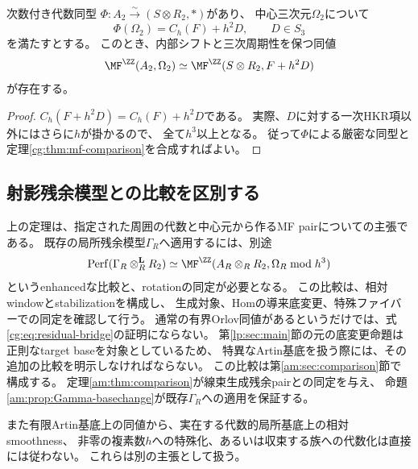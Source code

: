 \begin{corollary}[指定された中心元との照合]
\label{cg:cor:matching}
次数付き代数同型
$\Phi:A_2\xrightarrow{\sim}(S\otimes R_2,*)$があり、
中心三次元$\Omega_2$について
\[
 \Phi(\Omega_2)=C_h(F)+h^2D,\qquad D\in S_3
\]
を満たすとする。
このとき、内部シフトと三次周期性を保つ同値
\[
 \MF^{\ZZ}(A_2,\Omega_2)
 \simeq \MF^{\ZZ}(S\otimes R_2,F+h^2D)
\]
が存在する。
\end{corollary}
\begin{proof}
$C_h(F+h^2D)=C_h(F)+h^2D$である。
実際、$D$に対する一次HKR項以外にはさらに$h$が掛かるので、
全て$h^3$以上となる。
従って$\Phi$による厳密な同型と
定理\ref{cg:thm:mf-comparison}を合成すればよい。
\end{proof}

\subsection{射影残余模型との比較を区別する}

\begin{remark}[MF比較の適用範囲]
\label{cg:rem:scope}
上の定理は、指定された周囲の代数と中心元から作るMF pairについての主張である。
既存の局所残余模型$\Gamma_R$へ適用するには、別途
\begin{equation}\label{cg:eq:residual-bridge}
 \operatorname{Perf}(\Gamma_R\otimes_R^{\mathbf L}R_2)
 \simeq
 \MF^{\ZZ}(A_R\otimes_R R_2,\Omega_R\bmod h^3)
\end{equation}
というenhancedな比較と、rotationの同定が必要となる。
この比較は、相対windowとstabilizationを構成し、
生成対象、Homの導来底変更、特殊ファイバーでの同定を確認して行う。
通常の有界Orlov同値があるというだけでは、式\eqref{cg:eq:residual-bridge}の証明にならない。
第\ref{lp:sec:main}節の元の底変更命題は正則なtarget baseを対象としているため、
特異なArtin基底を扱う際には、その追加の比較を明示しなければならない。
この比較は第\ref{am:sec:comparison}節で構成する。
定理\ref{am:thm:comparison}が線束生成残余pairとの同定を与え、
命題\ref{am:prop:Gamma-basechange}が既存$\Gamma_R$への適用を保証する。

また有限Artin基底上の同値から、実在する代数的局所基底上の相対smoothness、
非零の複素数$h$への特殊化、あるいは収束する族への代数化は直接には従わない。
これらは別の主張として扱う。
\end{remark}

